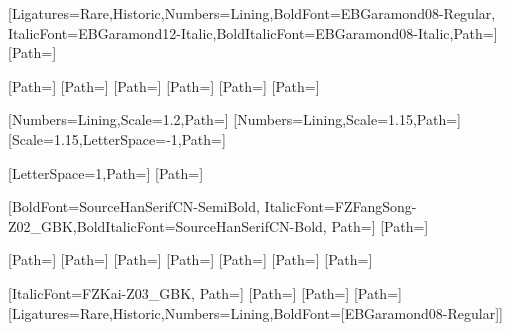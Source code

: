 \ifdefined\freefont
    \usepackage{fontspec}
    \usepackage[fontset=none]{ctex}
    \ifdefined\fontpath
        \setmainfont{EBGaramond12-Regular}[Ligatures={Rare,Historic},Numbers=Lining,BoldFont=EBGaramond08-Regular, ItalicFont=EBGaramond12-Italic,BoldItalicFont=EBGaramond08-Italic,Path=\fontpath]
        \setmonofont{FiraCode-Regular}[Path=\fontpath]

        \newfontfamily{}[Path=\fontpath]
        \newfontfamily{}[Path=\fontpath]
        \newfontfamily{}[Path=\fontpath]
        \newfontfamily{}[Path=\fontpath]
        \newfontfamily{}[Path=\fontpath]
        \newfontfamily{}[Path=\fontpath]

        \newfontfamily{}[Numbers=Lining,Scale=1.2,Path=\fontpath]
        \newfontfamily{}[Numbers=Lining,Scale=1.15,Path=\fontpath]
        \newfontfamily{}[Scale=1.15,LetterSpace=-1,Path=\fontpath]

        \newfontfamily{}[LetterSpace=1,Path=\fontpath]
        \newfontfamily{}[Path=\fontpath]

        [BoldFont=SourceHanSerifCN-SemiBold, ItalicFont=FZFangSong-Z02_GBK,BoldItalicFont=SourceHanSerifCN-Bold, Path=\fontpath]
        [Path=\fontpath]

        \newCJKfontfamily{}[Path=\fontpath]
        \newCJKfontfamily{}[Path=\fontpath]
        \newCJKfontfamily{}[Path=\fontpath]
        \newCJKfontfamily{}[Path=\fontpath]
        \newCJKfontfamily{}[Path=\fontpath]
        \newCJKfontfamily{}[Path=\fontpath]
        \newCJKfontfamily{}[Path=\fontpath]

        \newCJKfontfamily{}[ItalicFont=FZKai-Z03_GBK, Path=\fontpath] %
        \newCJKfontfamily{}[Path=\fontpath] %
        \newCJKfontfamily{}[Path=\fontpath] %
        \newCJKfontfamily{}[Path=\fontpath] %
    \else
        \setmainfont{EB Garamond 12 Regular}[Ligatures={Rare,Historic},Numbers=Lining,BoldFont=[EBGaramond08-Regular]]
        \setmonofont{Fira Code Regular}

